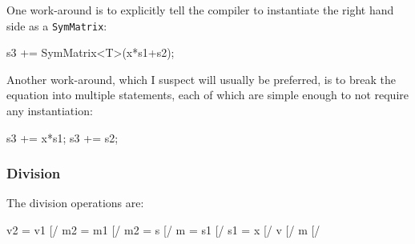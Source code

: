 \documentclass[twoside,letterpaper,11pt]{article}
\renewcommand{\tt}[1]{{\lstinline {#1}}}
\begin{document}
One work-around is to explicitly tell the compiler to instantiate the right hand
side as a \tt{SymMatrix}:
\begin{tmvcode}
s3 += SymMatrix<T>(x*s1+s2);
\end{tmvcode}

Another work-around, which I suspect will usually be preferred, is to break the 
equation into multiple statements, each of which are simple enough to not require
any instantiation:
\begin{tmvcode}
s3 += x*s1;
s3 += s2;
\end{tmvcode}

\subsubsection{Division}
The division operations are:
\begin{tmvcode}
v2 = v1 [/%
m2 = m1 [/%
m2 = s [/%
m = s1 [/%
s1 = x [/%
v [/%
m [/%
\end{tmvcode}
\end{document}
